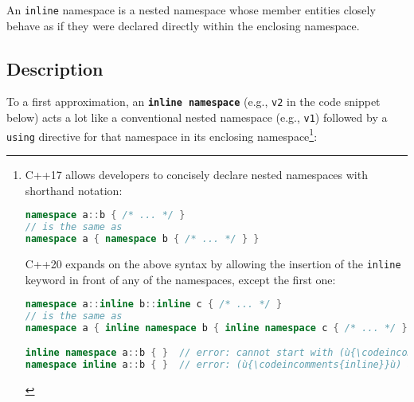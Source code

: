 
\setcounter{table}{0}
\setcounter{footnote}{0}
\setcounter{lstlisting}{0}


An \texttt{inline} namespace is a nested namespace whose member entities
closely behave as if they were declared directly within the enclosing
namespace.

\subsection[Description]{Description}\label{description-inlinenamespace}

To a first approximation, an \textbf{\texttt{inline}~\texttt{namespace}}
(e.g., \texttt{v2} in the code snippet below) acts a lot like a
conventional nested namespace (e.g., \texttt{v1}) followed by a
\texttt{using} directive for that namespace in its enclosing namespace{\cprotect\footnote{C++17 allows developers to concisely declare nested
namespaces with shorthand notation:
\begin{lstlisting}[language=C++, basicstyle={\ttfamily\footnotesize}]
namespace a::b { /* ... */ }
// is the same as
namespace a { namespace b { /* ... */ } }
\end{lstlisting}
C++20 expands on the above syntax by allowing the insertion of the
\texttt{inline} keyword in front of any of the namespaces, except the
first one:
\begin{lstlisting}[language=C++, basicstyle={\ttfamily\footnotesize}]
namespace a::inline b::inline c { /* ... */ }
// is the same as
namespace a { inline namespace b { inline namespace c { /* ... */ } } }

inline namespace a::b { }  // error: cannot start with (ù{\codeincomments{inline}}ù) for compound namespace names
namespace inline a::b { }  // error: (ù{\codeincomments{inline}}ù) at front of sequence explicitly disallowed
\end{lstlisting}
      }}:

